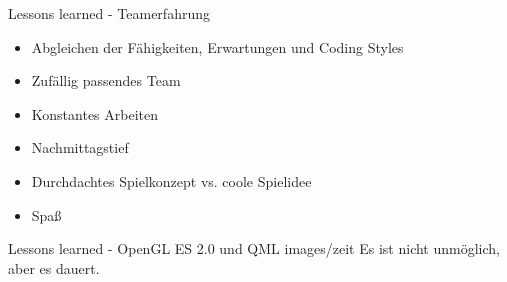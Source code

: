 \begin{frame}{Lessons learned - Teamerfahrung}
	\onetoone
	{
	\begin{itemize}
		\item Abgleichen der Fähigkeiten, Erwartungen und Coding Styles
		\item Zufällig passendes Team
		\item Konstantes Arbeiten
	\end{itemize}
	}
	{
	\begin{itemize}
		\item Nachmittagstief
		\item Durchdachtes Spielkonzept vs. coole Spielidee
		\item Spaß
	\end{itemize}
	}
	\begin{figure}
		\centering
	\end{figure}
\end{frame}

\slidegraphic
{Lessons learned - OpenGL ES 2.0 und QML}
{images/zeit}
{Es ist nicht unmöglich, aber es dauert.}


%

